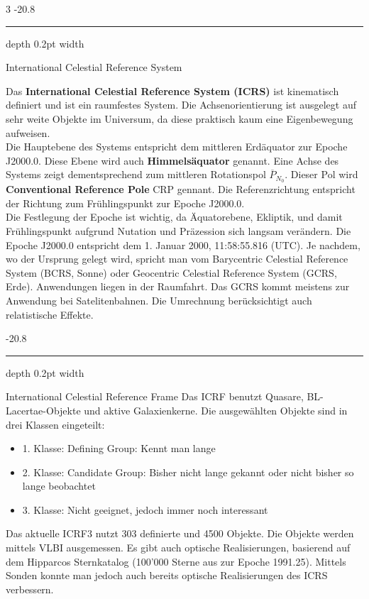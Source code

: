 \documentclass[8pt, landscape, fleqn]{scrartcl}
\makeatletter
\renewcommand{\subsubsection}{\@startsection{subsubsection}{1}{0mm}%
{-2\baselineskip}{0.8\baselineskip}%
{\hrule depth 0.2pt width\columnwidth\vspace*{1.2em}\normalsize\bfseries\rmfamily}}
\makeatother
\begin{document}
\begin{multicols*}{3}
\subsubsection{International Celestial Reference System}

Das \textbf{International Celestial Reference System (ICRS)} ist kinematisch definiert und ist ein raumfestes System. Die Achsenorientierung ist ausgelegt auf sehr weite Objekte im Universum, da diese praktisch kaum eine Eigenbewegung aufweisen. \\

Die Hauptebene des Systems entspricht dem mittleren Erdäquator zur Epoche J2000.0. Diese Ebene wird auch \textbf{Himmelsäquator} genannt. Eine Achse des Systems zeigt dementsprechend zum mittleren Rotationspol $\overline{P}_{N_0}$. Dieser Pol wird \textbf{Conventional Reference Pole} CRP gennant.
Die Referenzrichtung entspricht der Richtung zum Frühlingspunkt zur Epoche J2000.0.\\

Die Festlegung der Epoche ist wichtig, da Äquatorebene, Ekliptik, und damit Frühlingspunkt aufgrund Nutation und Präzession sich langsam verändern.
Die Epoche J2000.0 entspricht dem 1. Januar 2000, 11:58:55.816 (UTC). Je nachdem, wo der Ursprung gelegt wird, spricht man vom Barycentric Celestial Reference System (BCRS, Sonne) oder Geocentric Celestial Reference System (GCRS, Erde). Anwendungen liegen in der Raumfahrt. Das GCRS kommt meistens zur Anwendung bei Satelitenbahnen.
Die Umrechnung berücksichtigt auch relatistische Effekte.

\subsubsection{International Celestial Reference Frame}
Das ICRF benutzt Quasare, BL-Lacertae-Objekte und aktive Galaxienkerne. Die ausgewählten Objekte sind in drei Klassen eingeteilt:
\begin{itemize}
    \item 1. Klasse: Defining Group: Kennt man lange
    \item 2. Klasse: Candidate Group: Bisher nicht lange gekannt oder nicht bisher so lange beobachtet
    \item 3. Klasse: Nicht geeignet, jedoch immer noch interessant
\end{itemize}

Das aktuelle ICRF3 nutzt 303 definierte und 4500 Objekte. Die Objekte werden mittels VLBI ausgemessen. Es gibt auch optische Realisierungen, basierend auf dem Hipparcos Sternkatalog (100'000 Sterne aus zur Epoche 1991.25). Mittels Sonden konnte man jedoch auch bereits optische Realisierungen des ICRS verbessern. \\


\end{multicols*}
\end{document}
